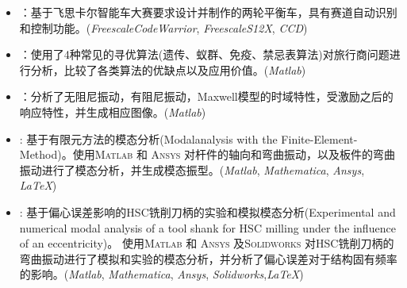 \documentclass[zh]{resume}
\newcommand{\Matlab}{\textsc{Matlab}\textsuperscript{\textregistered} }
\newcommand{\Ansys}{\textsc{Ansys}\textsuperscript{\textregistered} }
\newcommand{\Solidworks}{\textsc{Solidworks}\textsuperscript{\textregistered} }
\begin{document}
\begin{itemize}
	\item {}：基于飞思卡尔智能车大赛要求设计并制作的两轮平衡车，具有赛道自动识别和控制功能。(\textit{Freescale\textregistered CodeWarrior}, \textit{Freescale\textregistered S12X}, \textit{CCD})
	
	\item 
	：使用了4种常见的寻优算法(遗传、蚁群、免疫、禁忌表算法)对旅行商问题进行分析，比较了各类算法的优缺点以及应用价值。(\textit{Matlab\textregistered})
	
	\item {}：分析了无阻尼振动，有阻尼振动，Maxwell模型的时域特性，受激励之后的响应特性，并生成相应图像。(\textit{Matlab\textregistered})
	
	\item 
	: 
	      基于有限元方法的模态分析(Modalanalysis with the Finite-Element-Method)。使用\Matlab 和 \Ansys 对杆件的轴向和弯曲振动，以及板件的弯曲振动进行了模态分析，并生成模态振型。(\textit{Matlab\textregistered}, \textit{Mathematica\textregistered}, \textit{Ansys\textregistered}, \textit{\LaTeX})
	
	\item 
	: 
	基于偏心误差影响的HSC铣削刀柄的实验和模拟模态分析(Experimental and numerical modal analysis of a tool shank for HSC milling under the influence of an eccentricity)。 使用\Matlab 和 \Ansys 及\Solidworks 对HSC铣削刀柄的弯曲振动进行了模拟和实验的模态分析，并分析了偏心误差对于结构固有频率的影响。(\textit{Matlab\textregistered}, \textit{Mathematica\textregistered}, \textit{Ansys\textregistered}, \textit{Solidworks\textregistered},\textit{\LaTeX})
  		
\end{itemize}

\clearpage
\end{document}
